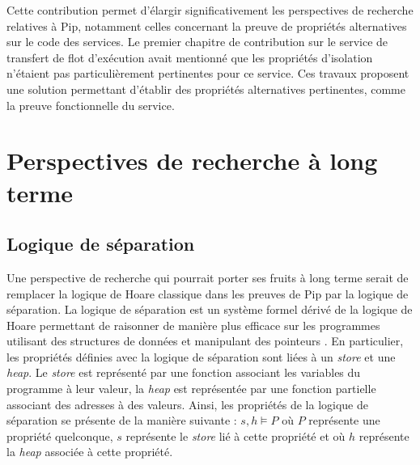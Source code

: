 		Cette contribution permet d'élargir significativement les perspectives de recherche relatives à Pip, notamment celles concernant la preuve de propriétés alternatives sur le code des services. Le premier chapitre de contribution sur le service de transfert de flot d'exécution avait mentionné que les propriétés d'isolation n'étaient pas particulièrement pertinentes pour ce service. Ces travaux proposent une solution permettant d'établir des propriétés alternatives pertinentes, comme la preuve fonctionnelle du service.


	\section{Perspectives de recherche à long terme}

		\subsection{Logique de séparation}

		Une perspective de recherche qui pourrait porter ses fruits à long terme serait de remplacer la logique de Hoare classique dans les preuves de Pip par la logique de séparation. La logique de séparation est un système formel dérivé de la logique de Hoare permettant de raisonner de manière plus efficace sur les programmes utilisant des structures de données et manipulant des pointeurs \cite{separationlogic, seplogic}.
		En particulier, les propriétés définies avec la logique de séparation sont liées à un \emph{store} et une \emph{heap}. Le \emph{store} est représenté par une fonction associant les variables du programme à leur valeur, la \emph{heap} est représentée par une fonction partielle associant des adresses à des valeurs. Ainsi, les propriétés de la logique de séparation se présente de la manière suivante : $s, h \vDash P$ où $P$ représente une propriété quelconque, $s$ représente le \emph{store} lié à cette propriété et où $h$ représente la \emph{heap} associée à cette propriété.

